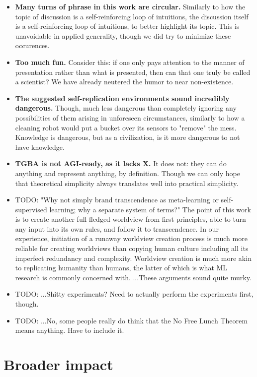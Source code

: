\documentclass{article}
\begin{document}
\begin{itemize}
\item \textbf{Many turns of phrase in this work are circular.} Similarly to how the topic of discussion is a self-reinforcing loop of intuitions, the discussion itself is a self-reinforcing loop of intuitions, to better highlight its topic. This is unavoidable in applied generality, though we did try to minimize these occurences.
\item \textbf{Too much fun.} Consider this: if one only pays attention to the manner of presentation rather than what is presented, then can that one truly be called a scientist? We have already neutered the humor to near non-existence.
\item \textbf{The suggested self-replication environments sound incredibly dangerous.} Though, much less dangerous than completely ignoring any possibilities of them arising in unforeseen circumstances, similarly to how a cleaning robot would put a bucket over its sensors to "remove" the mess. Knowledge is dangerous, but as a civilization, is it more dangerous to not have knowledge.
\item \textbf{TGBA is not AGI-ready, as it lacks X.} It does not: they can do anything and represent anything, by definition. Though we can only hope that theoretical simplicity always translates well into practical simplicity.
\item TODO: "Why not simply brand transcendence as meta-learning or self-supervised learning; why a separate system of terms?" The point of this work is to create another full-fledged worldview from first principles, able to turn any input into its own rules, and follow it to transcendence. In our experience, initiation of a runaway worldview creation process is much more reliable for creating worldviews than copying human culture including all its imperfect redundancy and complexity. Worldview creation is much more akin to replicating humanity than humans, the latter of which is what ML research is commonly concerned with. ...These arguments sound quite murky.
\item TODO: ...Shitty experiments? Need to actually perform the experiments first, though.
\item TODO: ...No, some people really do think that the No Free Lunch Theorem means anything. Have to include it.
\end{itemize}

\section{Broader impact}
\end{document}
